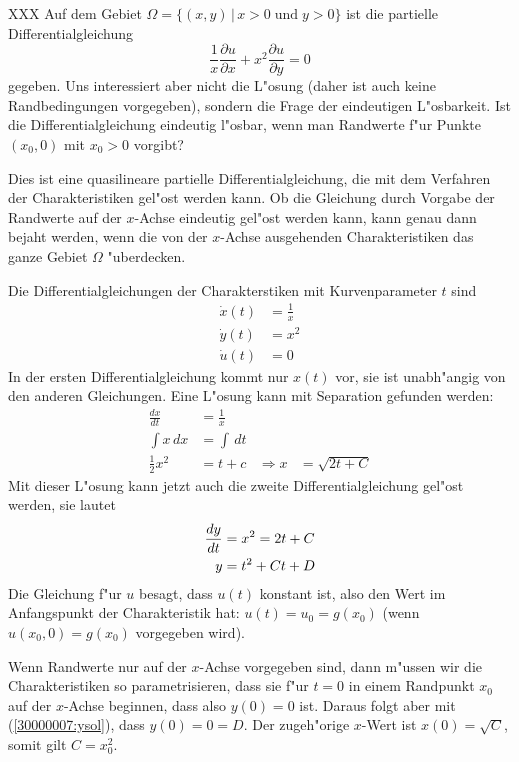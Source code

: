XXX
Auf dem Gebiet $\Omega = \{ (x,y)\,|\, x>0\;\text{und}\;y > 0\}$
ist die partielle Differentialgleichung
\begin{equation}
\frac1x\frac{\partial u}{\partial x}+x^2\frac{\partial u}{\partial y}=0
\label{30000007:pdgl}
\end{equation}
gegeben. Uns interessiert aber nicht die L"osung (daher ist auch keine
Randbedingungen vorgegeben), sondern die Frage der eindeutigen L"osbarkeit.
Ist die Differentialgleichung eindeutig l"osbar, wenn man Randwerte 
f"ur Punkte $(x_0,0)$ mit $x_0>0$ vorgibt?

\begin{loesung}
Dies ist eine quasilineare partielle Differentialgleichung, die mit
dem Verfahren der Charakteristiken gel"ost werden kann. Ob die Gleichung
durch Vorgabe der Randwerte auf der $x$-Achse eindeutig gel"ost werden
kann, kann genau dann bejaht werden, wenn die von der $x$-Achse
ausgehenden Charakteristiken das ganze Gebiet $\Omega$
"uberdecken.

Die Differentialgleichungen der Charakterstiken mit Kurvenparameter $t$ sind 
\begin{align*}
\dot x(t)&=\frac1x\\
\dot y(t)&=x^2\\
\dot u(t)&=0
\end{align*}
In der ersten Differentialgleichung kommt nur $x(t)$ vor, sie ist unabh"angig
von den anderen Gleichungen. Eine L"osung kann mit Separation gefunden werden:
\begin{align*}
\frac{dx}{dt}&=\frac1x\\
\int x\,dx&=\int \,dt\\
\frac12x^2&= t + c&\Rightarrow x&=\sqrt{2t + C}
\end{align*}
Mit dieser L"osung kann jetzt auch die zweite Differentialgleichung
gel"ost werden, sie lautet
\begin{align}
\frac{dy}{dt}&=x^2=2t+C \notag \\
y&=t^2+Ct + D \label{30000007:ysol}
\end{align}
Die Gleichung f"ur $u$ besagt, dass $u(t)$ konstant ist, also den
Wert im Anfangspunkt der Charakteristik hat: $u(t)=u_0=g(x_0)$ (wenn
$u(x_0,0)=g(x_0)$ vorgegeben wird).

Wenn Randwerte nur auf der $x$-Achse vorgegeben sind, dann m"ussen
wir die Charakteristiken so parametrisieren, dass sie f"ur $t=0$
in einem Randpunkt $x_0$ auf der $x$-Achse beginnen, dass also
$y(0)=0$ ist. Daraus folgt aber mit (\ref{30000007:ysol}), dass
$y(0)=0=D$. Der zugeh"orige $x$-Wert ist $x(0)=\sqrt{C}$, somit
gilt $C=x_0^2$.


\end{loesung}
